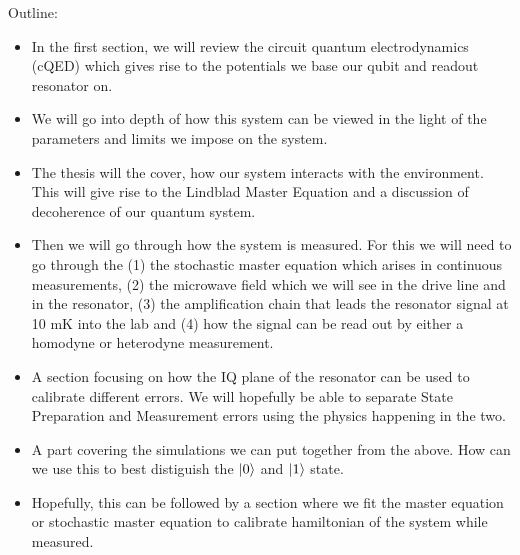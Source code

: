 \vfill 
\noindent
Outline:  
\begin{itemize}
    \item In the first section, we will review the circuit quantum electrodynamics (cQED) which gives rise to the potentials we base our qubit and readout resonator on.
    \item We will go into depth of how this system can be viewed in the light of the parameters and limits we impose on the system.
    \item The thesis will the cover, how our system interacts with the environment. This will give rise to the Lindblad Master Equation and a discussion of decoherence of our quantum system. 
    \item Then we will go through how the system is measured. For this we will need to go through the (1) the stochastic master equation which arises in continuous measurements, (2) the microwave field which we will see in the drive line and in the resonator, (3) the amplification chain that leads the resonator signal at 10 mK into the lab and (4) how the signal can be read out by either a homodyne or heterodyne measurement.
    \item A section focusing on how the IQ plane of the resonator can be used to calibrate different errors. We will hopefully be able to separate State Preparation and Measurement errors using the physics happening in the two.
    \item A part covering the simulations we can put together from the above. How can we use this to best distiguish the $\ket{0}$ and $\ket{1}$ state. 
    \item Hopefully, this can be followed by a section where we fit the master equation or stochastic master equation to calibrate hamiltonian of the system while measured.
\end{itemize}


